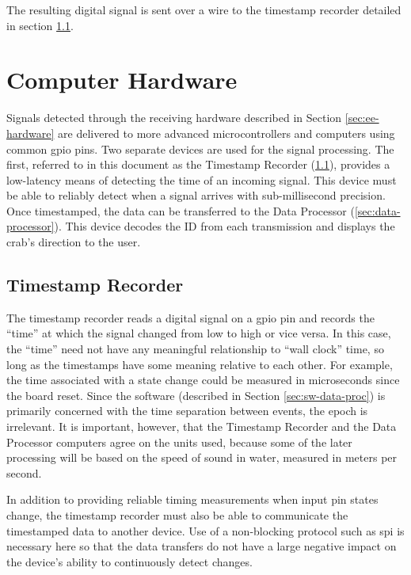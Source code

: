 \documentclass[12pt]{article}
\begin{document}
The resulting digital signal is sent over a wire to the timestamp
recorder detailed in section \ref{sec:ts-rec}.

\section{Computer Hardware}\label{sec:cs-hardware}

Signals detected through the receiving hardware described in
Section \ref{sec:ee-hardware} are delivered to more advanced microcontrollers
and computers using common \gls{gpio} pins.
Two separate devices are used for the signal processing.
The first,
referred to in this document as the Timestamp Recorder (\ref{sec:ts-rec}),
provides a
low-latency means of detecting the time of an incoming signal.
This device must be able to reliably detect when a signal arrives with
sub-millisecond precision.
Once timestamped, the data can be transferred to the
Data Processor (\ref{sec:data-processor}).
This device decodes the ID from each transmission and displays the crab's
direction to the user.

\subsection{Timestamp Recorder}\label{sec:ts-rec}

The timestamp recorder reads a digital signal on a \gls{gpio} pin and records
the ``time'' at which the signal changed from low to high or vice versa.
In this case, the ``time'' need not have any meaningful relationship to
``wall clock'' time, so long
as the timestamps have some meaning relative to each other.
For example, the time associated with a state change could be measured in
microseconds since the board reset.
Since the software (described in Section \ref{sec:sw-data-proc}) is primarily
concerned with the time separation between events, the epoch is irrelevant.
It is important, however, that the Timestamp Recorder and the Data Processor
computers agree on the units used, because some of the later processing will be
based on the speed of sound in water, measured in meters per second.

In addition to providing reliable timing measurements when input pin states
change, the timestamp recorder must also be able to communicate the timestamped
data to another device.
Use of a non-blocking protocol such as \gls{spi} is
necessary here so that the data transfers do not have a large negative impact
on the device's ability to continuously detect changes.
\end{document}
